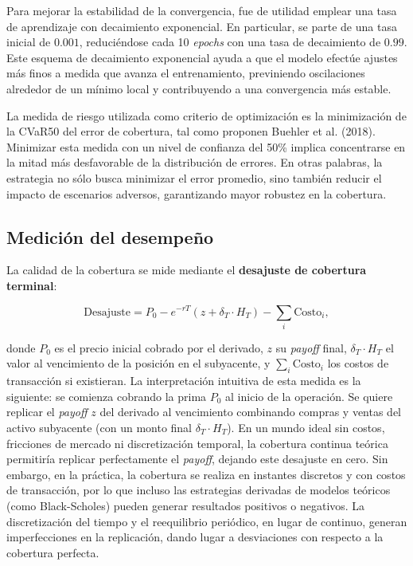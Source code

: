 \documentclass[11pt,a4paper,spanish]{article}
\numberwithin{equation}{section} %
\begin{document}
Para mejorar la estabilidad de la convergencia, fue de utilidad emplear una tasa de aprendizaje con decaimiento exponencial. En particular, se parte de una tasa inicial de \(0.001\), reduciéndose cada 10 \textit{epochs} con una tasa de decaimiento de \(0.99\). Este esquema de decaimiento exponencial ayuda a que el modelo efectúe ajustes más finos a medida que avanza el entrenamiento, previniendo oscilaciones alrededor de un mínimo local y contribuyendo a una convergencia más estable. 

La medida de riesgo utilizada como criterio de optimización es la minimización de la CVaR50 del error de cobertura, tal como proponen Buehler et al. (2018). Minimizar esta medida con un nivel de confianza del 50\% implica concentrarse en la mitad más desfavorable de la distribución de errores. En otras palabras, la estrategia no sólo busca minimizar el error promedio, sino también reducir el impacto de escenarios adversos, garantizando mayor robustez en la cobertura.

\subsection{Medición del desempeño}

La calidad de la cobertura se mide mediante el \textbf{desajuste de cobertura terminal}:

\begin{equation}
\text{Desajuste} = P_0 - e^{-rT}(z + \delta_T \cdot H_T) - \sum_{i} \text{Costo}_i,
\end{equation}

donde \(P_0\) es el precio inicial cobrado por el derivado, \(z\) su \textit{payoff} final, \(\delta_T \cdot H_T\) el valor al vencimiento de la posición en el subyacente, y \(\sum_i \text{Costo}_i\) los costos de transacción si existieran.  La interpretación intuitiva de esta medida es la siguiente: se comienza cobrando la prima \(P_0\) al inicio de la operación. Se quiere replicar el \textit{payoff} \(z\) del derivado al vencimiento combinando compras y ventas del activo subyacente (con un monto final \(\delta_T \cdot H_T\)). En un mundo ideal sin costos, fricciones de mercado ni discretización temporal, la cobertura continua teórica permitiría replicar perfectamente el \textit{payoff}, dejando este desajuste en cero. Sin embargo, en la práctica, la cobertura se realiza en instantes discretos y con costos de transacción, por lo que incluso las estrategias derivadas de modelos teóricos (como Black-Scholes) pueden generar resultados positivos o negativos. La discretización del tiempo y el reequilibrio periódico, en lugar de continuo, generan imperfecciones en la replicación, dando lugar a desviaciones con respecto a la cobertura perfecta.
\end{document}
